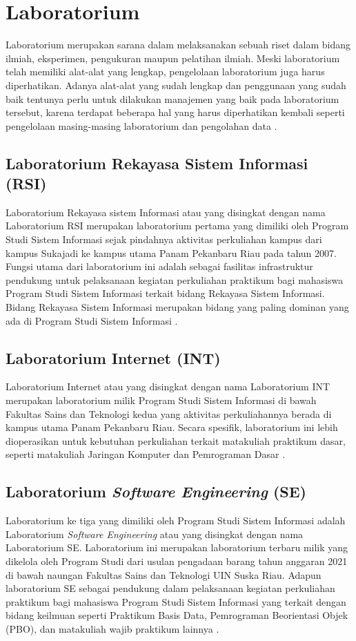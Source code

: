 \section{Laboratorium}
Laboratorium merupakan sarana dalam melaksanakan sebuah riset dalam bidang ilmiah, eksperimen, pengukuran maupun pelatihan ilmiah. Meski laboratorium telah memiliki alat-alat yang lengkap, pengelolaan laboratorium juga harus diperhatikan. Adanya alat-alat yang sudah lengkap dan penggunaan yang sudah baik tentunya perlu untuk dilakukan manajemen yang baik pada laboratorium tersebut, karena terdapat beberapa hal yang harus diperhatikan kembali seperti pengelolaan masing-masing laboratorium dan pengolahan data \cite{sweden2022rancang}.
\subsection{Laboratorium Rekayasa Sistem Informasi (RSI)}
Laboratorium Rekayasa sistem Informasi atau yang disingkat dengan nama Laboratorium RSI merupakan laboratorium pertama yang dimiliki oleh Program Studi Sistem Informasi sejak pindahnya aktivitas perkuliahan kampus dari kampus Sukajadi ke kampus utama Panam Pekanbaru Riau pada tahun 2007. Fungsi utama dari laboratorium ini adalah sebagai fasilitas infrastruktur pendukung untuk pelaksanaan kegiatan perkuliahan praktikum bagi mahasiswa Program Studi Sistem Informasi terkait bidang Rekayasa Sistem Informasi. Bidang Rekayasa Sistem Informasi merupakan bidang yang paling dominan yang ada di Program Studi Sistem Informasi \cite{lab-si-website}.

\subsection{Laboratorium Internet (INT)}
Laboratorium Internet atau yang disingkat dengan nama Laboratorium INT merupakan laboratorium milik Program Studi Sistem Informasi di bawah Fakultas Sains dan Teknologi kedua yang aktivitas perkuliahannya berada di kampus utama Panam Pekanbaru Riau. Secara spesifik, laboratorium ini lebih dioperasikan untuk kebutuhan perkuliahan terkait matakuliah praktikum dasar, seperti matakuliah Jaringan Komputer dan Pemrograman Dasar \cite{lab-si-website}.

\subsection{Laboratorium \textit{Software Engineering} (SE)}
Laboratorium ke tiga yang dimiliki oleh Program Studi Sistem Informasi adalah Laboratorium \textit{Software Engineering} atau yang disingkat dengan nama Laboratorium SE. Laboratorium ini merupakan laboratorium terbaru milik yang dikelola oleh Program Studi dari usulan pengadaan barang tahun anggaran 2021 di bawah naungan Fakultas Sains dan Teknologi UIN Suska Riau. Adapun laboratorium SE sebagai pendukung dalam pelaksanaan kegiatan perkuliahan praktikum bagi mahasiswa Program Studi Sistem Informasi yang terkait dengan bidang keilmuan seperti Praktikum Basis Data, Pemrograman Beorientasi Objek (PBO), dan matakuliah wajib praktikum lainnya \cite{lab-si-website}.

